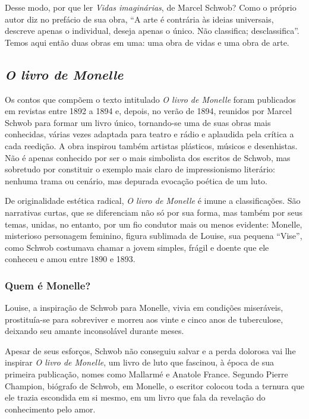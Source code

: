 \documentclass[12pt]{extarticle}
\begin{document}
Desse modo, por que ler \textit{Vidas imaginárias}, de Marcel Schwob? Como o
próprio autor diz no prefácio de sua obra, ``A arte é contrária às
ideias universais, descreve apenas o individual, deseja apenas o único.
Não classifica; desclassifica''. Temos aqui então duas obras em
uma: uma obra de vidas e uma obra de arte.

\subsection{\emph{O livro de Monelle}}

Os contos que compõem o texto intitulado \emph{O livro de Monelle} foram
publicados em revistas entre 1892 a 1894 e, depois, no
verão de 1894, reunidos por Marcel Schwob para formar
um livro único, tornando-se uma de suas obras mais conhecidas,
várias vezes adaptada para teatro e rádio e aplaudida
pela crítica a cada reedição. A obra inspirou também artistas
plásticos, músicos e desenhistas. Não
é apenas conhecido por ser o mais simbolista dos escritos
de Schwob, mas sobretudo por constituir o exemplo
mais claro de impressionismo literário: nenhuma trama
ou cenário, mas depurada evocação poética de um luto.

De originalidade estética radical, \emph{O livro de
Monelle} é imune a classificações. São narrativas curtas,
que se diferenciam não só por sua forma, mas também
por seus temas, unidas, no entanto, por um fio condutor
mais ou menos evidente: Monelle, misterioso personagem
feminino, figura sublimada de Louise, sua pequena
``Vise'', como Schwob costumava chamar a jovem simples,
frágil e doente que ele conheceu e amou entre 1890
e 1893.

\subsubsection{Quem é Monelle?}

Louise, a inspiração de Schwob para Monelle, vivia em condições miseráveis, prostituía-se
para sobreviver e morreu aos vinte e cinco anos de tuberculose,
deixando seu amante inconsolável durante
meses.

Apesar de seus esforços, Schwob não conseguiu
salvar e a perda dolorosa vai lhe inspirar \emph{O livro de
Monelle}, um livro de luto que fascinou, à época de sua
primeira publicação, nomes como Mallarmé e Anatole
France. Segundo Pierre Champion, biógrafo de Schwob, em
Monelle, o escritor colocou toda a ternura que ele 
trazia escondida em si mesmo, em um livro que fala da
revelação do conhecimento pelo amor.
\end{document}
